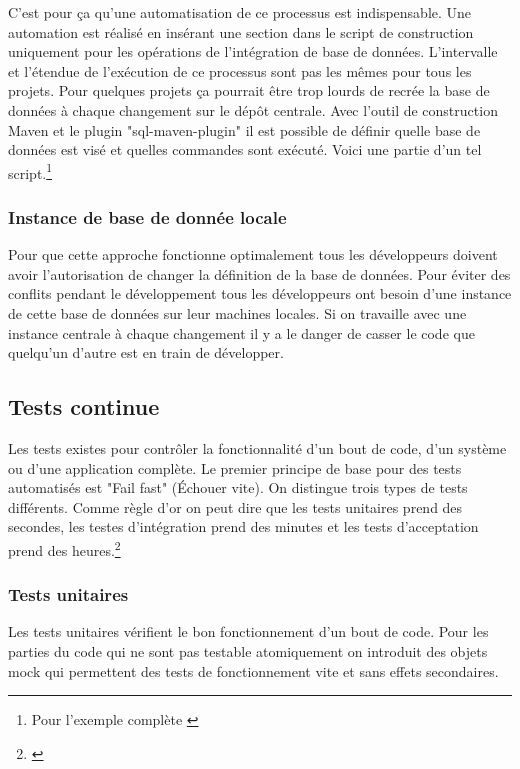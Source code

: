 C'est pour ça qu'une automatisation de ce processus est indispensable. Une automation est réalisé en insérant une section dans le script de construction uniquement pour les opérations de l'intégration de base de données. L'intervalle et l'étendue de l'exécution de ce processus sont pas les mêmes pour tous les projets. Pour quelques projets ça pourrait être trop lourds de recrée la base de données à chaque changement sur le dépôt centrale. Avec l'outil de construction Maven et le plugin "sql-maven-plugin" il est possible de définir quelle base de données est visé et quelles commandes sont exécuté. Voici une partie d'un tel script.\footnote{Pour l'exemple complète \cite{mvnsql}}



\subsubsection{Instance de base de donnée locale}

Pour que cette approche fonctionne optimalement tous les développeurs doivent avoir l'autorisation de changer la définition de la base de données. Pour éviter des conflits pendant le développement tous les développeurs ont besoin d'une instance de cette base de données sur leur machines locales. Si on travaille avec une instance centrale à chaque changement il y a le danger de casser le code que quelqu'un d'autre est en train de développer.
\newpage


\subsection{Tests continue}
Les tests existes pour contrôler la fonctionnalité d'un bout de code, d'un système ou d'une application complète. Le premier principe de base pour des tests automatisés est "Fail fast" (Échouer vite). On distingue trois types de tests différents. Comme règle d'or on peut dire que les tests unitaires prend des secondes, les testes d'intégration prend des minutes et les tests d'acceptation prend des heures.\footnote{\citep{artofunittesting}}

\subsubsection{Tests unitaires}
Les tests unitaires vérifient le bon fonctionnement d'un bout de code. Pour les parties du code qui ne sont pas testable atomiquement on introduit des objets mock qui permettent des tests de fonctionnement vite et sans effets secondaires. 
